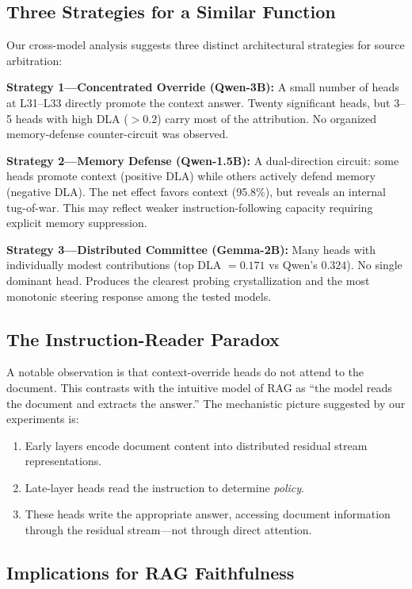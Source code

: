 \documentclass{article}
\begin{document}
\subsection{Three Strategies for a Similar Function}

Our cross-model analysis suggests three distinct architectural strategies for source arbitration:

\textbf{Strategy 1---Concentrated Override (Qwen-3B):} A small number of heads at L31--L33 directly promote the context answer. Twenty significant heads, but 3--5 heads with high DLA ($> 0.2$) carry most of the attribution. No organized memory-defense counter-circuit was observed.

\textbf{Strategy 2---Memory Defense (Qwen-1.5B):} A dual-direction circuit: some heads promote context (positive DLA) while others actively defend memory (negative DLA). The net effect favors context (95.8\%), but reveals an internal tug-of-war. This may reflect weaker instruction-following capacity requiring explicit memory suppression.

\textbf{Strategy 3---Distributed Committee (Gemma-2B):} Many heads with individually modest contributions (top DLA $= 0.171$ vs Qwen's $0.324$). No single dominant head. Produces the clearest probing crystallization and the most monotonic steering response among the tested models.

\subsection{The Instruction-Reader Paradox}

A notable observation is that context-override heads do not attend to the document. This contrasts with the intuitive model of RAG as ``the model reads the document and extracts the answer.'' The mechanistic picture suggested by our experiments is:
\begin{enumerate}
    \item Early layers encode document content into distributed residual stream representations.
    \item Late-layer heads read the instruction to determine \emph{policy}.
    \item These heads write the appropriate answer, accessing document information through the residual stream---not through direct attention.
\end{enumerate}

\subsection{Implications for RAG Faithfulness}
\end{document}
